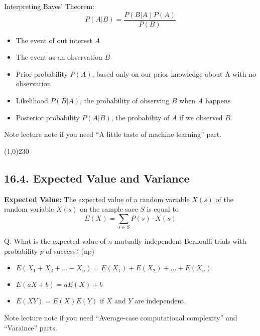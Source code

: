Interpreting Bayes' Theorem:
$$P(A|B) = \frac{P(B|A)P(A)}{P(B)}$$
\begin{itemize}
    \item The event of out interest $A$
    \item The event as an observation $B$
    \item Prior probability $P(A)$, based only on our prior knowledge about A with no observation.
    \item Likelihood $P(B|A)$, the probability of observing $B$ when $A$ happens
    \item Posterior probability $P(A|B)$, the probability of $A$ if we observed $B$.
\end{itemize}

Note lecture note if you need ``A little taste of machine learning'' part.

\begin{center}
\line(1,0){230}
\end{center}

\subsection*{16.4. Expected Value and Variance}

\begin{definition}
    \textbf{Expected Value: } The expected value of a random variable $X(s)$ of the random variable $X(s)$ on the sample sace $S$ is equal to $$E(X) = \sum_{s \in S} P(s) \cdot X(s)$$
\end{definition}


Q. What is the expected value of $n$ mutually independent Bernoulli trials with probability $p$ of success? (np)\\

\begin{itemize}
    \item $E(X_1 + X_2 + \dots + X_n) = E(X_1) + E(X_2) + \dots + E(X_n)$
    \item $E(aX + b) = aE(X) + b$
    \item $E(XY) = E(X)E(Y)$ if $X$ and $Y$ are independent.
\end{itemize}

Note lecture note if you need ``Average-case computational complexity'' and ``Varaince'' parts.
